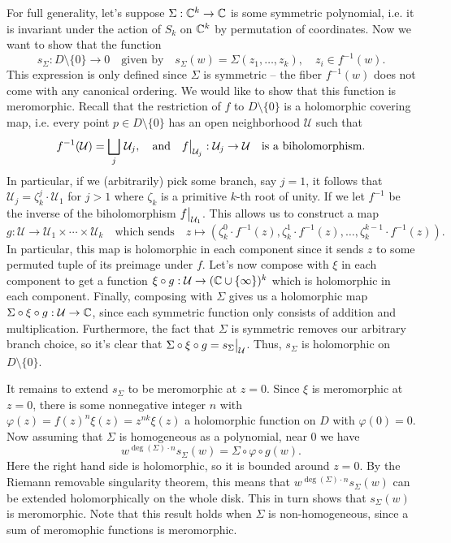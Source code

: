 \documentclass{lkx_pset}
\begin{document}
\begin{solution}
  For full generality, let's suppose $\Sigma : \mathbb{C}^k \to \mathbb{C}$ is some symmetric polynomial, i.e. it is invariant under the action of $S_k$ on $\mathbb{C}^k$ by permutation of coordinates. Now we want to show that the function
  \[
    s_\Sigma : D\setminus \{0\} \to 0\quad\textrm{given by}\quad s_\Sigma(w) = \Sigma(z_1,\ldots, z_k), \quad z_i\in f^{-1}(w).
  \]
  This expression is only defined since $\Sigma$ is symmetric -- the fiber $f^{-1}(w)$ does not come with any canonical ordering. We would like to show that this function is meromorphic. Recall that the restriction of $f$ to $D\setminus \{0\}$ is a holomorphic covering map, i.e. every point $p\in D\setminus \{0\}$ has an open neighborhood $\mathcal{U}$ such that
  \[
    f^{-1}(\mathcal{U}) = \bigsqcup_{j}\, \mathcal{U}_j, \quad \textrm{and}\quad \restr{f}{\mathcal{U}_j} : \mathcal{U}_j \to \mathcal{U}\quad\textrm{is a biholomorphism.}
  \]
  In particular, if we (arbitrarily) pick some branch, say $j=1$, it follows that $\mathcal{U}_j = \zeta^j_k\cdot \mathcal{U}_1$ for $j>1$ where $\zeta_k$ is a primitive $k$-th root of unity. If we let $f^{-1}$ be the inverse of the biholomorphism $\restr{f}{\mathcal{U}_1}$. This allows us to construct a map
  \[
    g : \mathcal{U} \to \mathcal{U}_1\times\cdots\times\mathcal{U}_k\quad\textrm{which sends}\quad z \mapsto (\zeta_k^0\cdot f^{-1}(z), \zeta_k^1\cdot f^{-1}(z), \ldots, \zeta_k^{k-1}\cdot f^{-1}(z)).
  \]
  In particular, this map is holomorphic in each component since it sends $z$ to some permuted tuple of its preimage under $f$. Let's now compose with $\xi$ in each component to get a function $\xi\circ g : \mathcal{U}\to (\mathbb{C}\cup\{\infty\})^k$ which is holomorphic in each component. Finally, composing with $\Sigma$ gives us a holomorphic map $\Sigma \circ\xi\circ g : \mathcal{U} \to \mathbb{C}$, since each symmetric function only consists of addition and multiplication.
  Furthermore, the fact that $\Sigma$ is symmetric removes our arbitrary branch choice, so it's clear that $\Sigma \circ \xi \circ g = \restr{s_\Sigma}{\mathcal{U}}$. Thus, $s_\Sigma$ is holomorphic on $D\setminus \{0\}$.

  It remains to extend $s_\Sigma$ to be meromorphic at $z=0$. Since $\xi$ is meromorphic at $z=0$, there is some nonnegative integer $n$ with $\varphi(z) = f(z)^n\xi(z)=z^{nk}\xi(z)$ a holomorphic function on $D$ with $\varphi(0)=0$. Now assuming that $\Sigma$ is homogeneous as a polynomial, near $0$ we have 
  \[
    w^{\deg(\Sigma)\cdot n} s_\Sigma(w) = \Sigma\circ \varphi\circ g(w).
  \]
  Here the right hand side is holomorphic, so it is bounded around $z=0$. By the Riemann removable singularity theorem, this means that $w^{\deg(\Sigma)\cdot n}s_\Sigma(w)$ can be extended holomorphically on the whole disk. This in turn shows that $s_\Sigma(w)$ is meromorphic. Note that this result holds when $\Sigma$ is non-homogeneous, since a sum of meromophic functions is meromorphic.
\end{solution}
\end{document}
